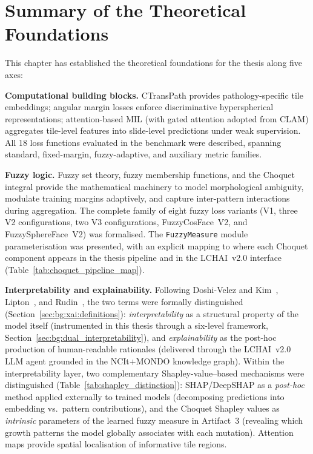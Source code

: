 \section{Summary of the Theoretical Foundations}
\label{sec:bg:summary}

This chapter has established the theoretical foundations for the thesis along five axes:

\textbf{Computational building blocks.}
CTransPath provides pathology-specific tile embeddings; angular margin losses enforce discriminative hyperspherical representations; attention-based MIL (with gated attention adopted from CLAM) aggregates tile-level features into slide-level predictions under weak supervision.
All 18 loss functions evaluated in the benchmark were described, spanning standard, fixed-margin, fuzzy-adaptive, and auxiliary metric families.

\textbf{Fuzzy logic.}
Fuzzy set theory, fuzzy membership functions, and the Choquet integral provide the mathematical machinery to model morphological ambiguity, modulate training margins adaptively, and capture inter-pattern interactions during aggregation.
The complete family of eight fuzzy loss variants (V1, three V2 configurations, two V3 configurations, FuzzyCosFace~V2, and FuzzySphereFace~V2) was formalised.
The \texttt{FuzzyMeasure} module parameterisation was presented, with an explicit mapping to where each Choquet component appears in the thesis pipeline and in the LCHAI~v2.0 interface (Table~\ref{tab:choquet_pipeline_map}).

\textbf{Interpretability and explainability.}
Following Doshi-Velez and Kim~\cite{doshivelez2017rigorous},
Lipton~\cite{lipton2018mythos}, and Rudin~\cite{rudin2019stop},
the two terms were formally distinguished
(Section~\ref{sec:bg:xai:definitions}): \emph{interpretability} as
a structural property of the model itself (instrumented in this
thesis through a six-level framework, Section~\ref{sec:bg:dual_interpretability}),
and \emph{explainability} as the post-hoc production of human-readable
rationales (delivered through the LCHAI~v2.0 LLM agent grounded in
the NCIt+MONDO knowledge graph).
Within the interpretability layer, two complementary
Shapley-value--based mechanisms were distinguished
(Table~\ref{tab:shapley_distinction}): SHAP/DeepSHAP as a \emph{post-hoc}
method applied externally to trained models (decomposing predictions
into embedding vs.\ pattern contributions), and the Choquet Shapley
values as \emph{intrinsic} parameters of the learned fuzzy measure
in Artifact~3 (revealing which growth patterns the model globally
associates with each mutation).
Attention maps provide spatial localisation of informative tile regions.

